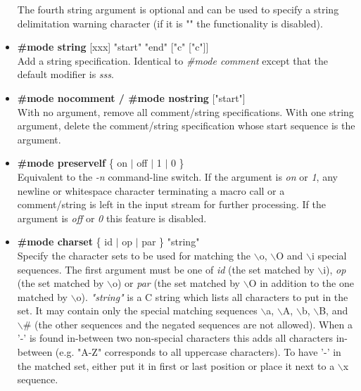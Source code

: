 \begin{itemize}
The fourth string argument is optional and can be used to specify a
string delimitation warning character (if it is "" the functionality is
disabled).
\item
{\bf \#mode string } [xxx] "start" "end" ["c" ["c"]]\\
Add a string specification. Identical to {\it \#mode comment} except that
the default modifier is {\it sss}.
\item
{\bf \#mode nocomment / \#mode nostring } ["start"]\\
With no argument, remove all comment/string specifications. With one
string argument, delete the comment/string specification whose start
sequence is the argument.
\item
{\bf \#mode preservelf } \{ on $|$ off $|$ 1 $|$ 0 \}\\
Equivalent to the {\it -n} command-line switch. If the argument is {\it on}
or {\it 1}, any newline or whitespace character terminating a macro call or 
a comment/string is left in the input stream for further processing. If the
argument is {\it off} or {\it 0} this feature is disabled.
\item
{\bf \#mode charset } \{ id $|$ op $|$ par \} "string"\\
Specify the character sets to be used for matching the $\backslash$o, $\backslash$O and
$\backslash$i special sequences. The first argument must be one of {\it id}
(the set matched by $\backslash$i), {\it op} (the set matched by $\backslash$o) or {\it par}
(the set matched by $\backslash$O in addition to the one matched by $\backslash$o).
{\it "string"} is a C string which lists all characters to put in the set.
It may contain only the special matching sequences $\backslash$a, $\backslash$A, $\backslash$b, $\backslash$B, 
and $\backslash$\# (the other sequences and the negated sequences are not allowed). 
When a '-' is found in-between two non-special characters this adds all 
characters in-between (e.g. "A-Z" corresponds to all uppercase characters). 
To have '-' in the matched set, either put it in first or last position
or place it next to a $\backslash$x sequence.
\end{itemize}
